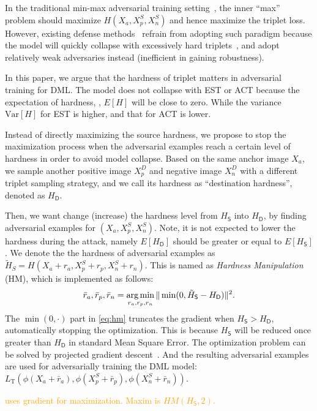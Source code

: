 \documentclass[10pt,twocolumn,letterpaper]{article}
\newcommand{\oo}[1]{\textcolor{orange}{#1}}
\begin{document}
In the traditional min-max adversarial training setting~\cite{madry}, the inner
``max'' problem should maximize $H(X_a,X_p^S,X_n^S)$ and hence maximize the triplet
loss.
%
However, existing defense methods~\cite{advorder,robrank} refrain from adopting
such paradigm because the model will quickly collapse with excessively hard
triplets~\cite{facenet}, and adopt relatively weak adversaries instead
(inefficient in gaining robustness).

In this paper, we argue that the hardness of triplet matters in adversarial
training for DML.
%
The model does not collapse with EST or ACT because the expectation of hardness,
\ie, $E[H]$ will be close to zero.
%
While the variance $\text{Var}[H]$ for EST is higher, and that for ACT is lower.

Instead of directly maximizing the source hardness, we propose to stop the
maximization process when the adversarial examples reach a certain level of
hardness in order to avoid model collapse.
%
Based on the same anchor image $X_a$, we sample another positive image $X_p^D$
and negative image $X_n^D$ with a different triplet sampling strategy, and
we call its hardness as ``destination hardness'', denoted as $H_\mathsf{D}$.

Then, we want change (increase) the hardness level from $H_\mathsf{S}$ into $H_\mathsf{D}$, by
finding adversarial examples for $(X_a, X_p^S, X_n^S)$.
%
Note, it is not expected to lower the hardness during the attack, namely
$E[H_\mathsf{D}]$ should be greater or equal to $E[H_\mathsf{S}]$.
%
We denote the the hardness of adversarial examples as $\tilde{H}_S=H(X_a{+}r_a,
X_p^S{+}r_p, X_n^S{+}r_n)$.
%
This is named as \emph{Hardness Manipulation} (HM), which is implemented as
follows:
%
\begin{equation}
	\bar{r}_a, \bar{r}_p, \bar{r}_n = \operatorname*{arg\,min}_{r_a,r_p,r_n} \|\min(0,
	\tilde{H}_\mathsf{S}-H_\mathsf{D})\|^2.
	\label{eq:hm}
\end{equation}
%
The $\min(0,\cdot)$ part in \cref{eq:hm} truncates the gradient when $H_\mathsf{S}>H_\mathsf{D}$,
automatically stopping the optimization.
%
This is because $H_\mathsf{S}$ will be reduced once greater than $H_\mathsf{D}$ in standard Mean
Square Error.
%
The optimization problem can be solved by projected gradient
descent~\cite{madry}.
%
And the resulting adversarial examples are used for adversarially training the
DML model:
%
$L_\text{T}(\phi(X_a+\bar{r}_a), \phi(X_p^S+\bar{r}_p),
\phi(X_n^S+\bar{r}_n))$.

\oo{uses gradient for maximization. Maxim is $HM(H_\mathsf{S}, 2)$.}
\end{document}
